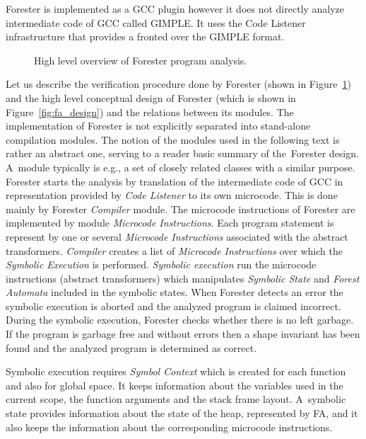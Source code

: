 Forester is implemented as a GCC plugin however it does not directly
analyze intermediate code of GCC called GIMPLE.
It uses the Code Listener infrastructure \cite{cl11}
that provides a fronted over the GIMPLE format.

\begin{figure}[bt]
	\begin{center}
		
	\end{center}
	\caption{High level overview of Forester program analysis.}
	\label{fig:fa_exec}
\end{figure}

Let us describe the verification procedure done by Forester (shown in Figure~\ref{fig:fa_exec})
and the high level conceptual design of Forester (which is shown in Figure~\ref{fig:fa_design})
and the relations between its modules.
The implementation of Forester is not explicitly separated into stand-alone compilation modules.
The notion of the modules used in the following text is rather an abstract one, serving to a reader basic summary of the~Forester design.
A~module typically is e.g., a set of closely related classes with a similar purpose.
Forester starts the analysis by translation of the intermediate
code of GCC in representation provided by \emph{Code Listener} to its own microcode.
This is done mainly by Forester \emph{Compiler} module.
The microcode instructions of Forester are implemented by module \emph{Microcode Instructions}.
Each program statement is represent by one
or several \emph{Microcode Instructions} associated with the abstract transformers.
\emph{Compiler} creates a list of \emph{Microcode Instructions} over which the \emph{Symbolic Execution} is performed.
\emph{Symbolic execution} run the microcode instructions (abstract transformers)
which manipulates \emph{Symbolic State} and
\emph{Forest Automata} included in the symbolic states.
When Forester detects an error the symbolic execution is aborted and
the analyzed program is claimed incorrect.
During the symbolic execution, Forester checks whether there is no left garbage.
If the program is garbage free and without errors then a shape invariant has been found
and the analyzed program is determined as correct.

Symbolic execution requires \emph{Symbol Context} which is created for each function and also for global space.
It keeps information about the variables used in the current scope,
the function arguments and the stack frame layout.
A~symbolic state provides information about the state of the heap, represented
by FA, and it also keeps the information about
the corresponding microcode instructions.

